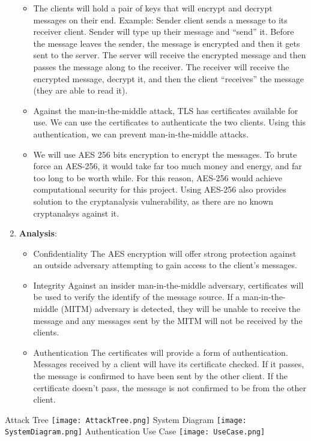 \documentclass{article}
\begin{document}
\begin{enumerate}
\begin{itemize}
\item The clients will hold a pair of keys that will encrypt and decrypt
     messages on their end. 
    Example: Sender client sends a message to its receiver client. Sender will type up their message
    and “send” it. Before the message leaves the sender, the message is encrypted and then it gets
    sent to the server. The server will receive the encrypted message and then passes the message
    along to the receiver. The receiver will receive the encrypted message, decrypt it, and then the
     client “receives” the message (they are able to read it).\newline
    \item Against the man-in-the-middle attack, TLS has certificates available for use. We can use the
     certificates to authenticate the two clients. Using this authentication, we can prevent 
     man-in-the-middle attacks.\newline
	\item We will use AES 256 bits encryption to encrypt the messages. To
     brute force an AES-256, it would take far too much money and energy, and far too long to be
      worth while. For this reason, AES-256 would achieve computational security for this project. 
      Using AES-256 also provides solution to the cryptanalysis vulnerability, as there are no known
       cryptanalsys	against it.\newline
\end{itemize}
	
	\item \textbf{Analysis}:
	\begin {itemize}
		\item Confidentiality\newline
            The AES encryption will offer strong protection against an outside adversary attempting
            to gain access to the client's messages. 
		\item Integrity\newline
            Against an insider man-in-the-middle adversary, certificates will be used to verify the 
            identify of the message source. If a man-in-the-middle (MITM) adversary is detected,
            they will be unable to receive the message and any messages sent by the MITM will not be
            received by the clients.
		\item Authentication\newline
            The certificates will provide a form of authentication. Messages received by a client 
            will have its certificate checked. If it passes, the message is confirmed to have been 
            sent by the other client. If the certificate doesn't pass, the message is not confirmed
            to be from the other client.
    \end {itemize}
	
\end{enumerate}
Attack Tree \newline
\texttt{[image: AttackTree.png]}\newline
System Diagram \newline
\texttt{[image: SystemDiagram.png]}\newline
Authentication Use Case \newline
\texttt{[image: UseCase.png]}
\end{document}
